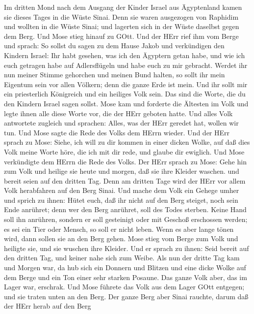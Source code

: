  Im dritten Mond nach dem Ausgang der Kinder Israel aus
Ägyptenland kamen sie dieses Tages in die Wüste Sinai.  Denn
sie waren ausgezogen von Raphidim und wollten in die Wüste Sinai; und
lagerten sich in der Wüste daselbst gegen dem Berg.  Und
Mose stieg hinauf zu GOtt. Und der HErr rief ihm vom Berge und sprach:
So sollst du sagen zu dem Hause Jakob und verkündigen den Kindern
Israel:  Ihr habt gesehen, was ich den Ägyptern getan habe,
und wie ich euch getragen habe auf Adlersflügeln und habe euch zu mir
gebracht.  Werdet ihr nun meiner Stimme gehorchen und meinen
Bund halten, so sollt ihr mein Eigentum sein vor allen Völkern; denn die
ganze Erde ist mein.  Und ihr sollt mir ein priesterlich
Königreich und ein heiliges Volk sein. Das sind die Worte, die du den
Kindern Israel sagen sollst.  Mose kam und forderte die
Ältesten im Volk und legte ihnen alle diese Worte vor, die der HErr
geboten hatte.  Und alles Volk antwortete zugleich und
sprachen: Alles, was der HErr geredet hat, wollen wir tun. Und Mose
sagte die Rede des Volks dem HErrn wieder.  Und der HErr
sprach zu Mose: Siehe, ich will zu dir kommen in einer dicken Wolke, auf
daß dies Volk meine Worte höre, die ich mit dir rede, und glaube dir
ewiglich. Und Mose verkündigte dem HErrn die Rede des Volks.
 Der HErr sprach zu Mose: Gehe hin zum Volk und heilige sie
heute und morgen, daß sie ihre Kleider waschen.  und bereit
seien auf den dritten Tag. Denn am dritten Tage wird der HErr vor allem
Volk herabfahren auf den Berg Sinai.  Und mache dem Volk
ein Gehege umher und sprich zu ihnen: Hütet euch, daß ihr nicht auf den
Berg steiget, noch sein Ende anrühret; denn wer den Berg anrühret, soll
des Todes sterben.  Keine Hand soll ihn anrühren, sondern
er soll gesteinigt oder mit Geschoß erschossen werden; es sei ein Tier
oder Mensch, so soll er nicht leben. Wenn es aber lange tönen wird, dann
sollen sie an den Berg gehen.  Mose stieg vom Berge zum
Volk und heiligte sie, und sie wuschen ihre Kleider.  Und
er sprach zu ihnen: Seid bereit auf den dritten Tag, und keiner nahe
sich zum Weibe.  Als nun der dritte Tag kam und Morgen war,
da hub sich ein Donnern und Blitzen und eine dicke Wolke auf dem Berge
und ein Ton einer sehr starken Posaune. Das ganze Volk aber, das im
Lager war, erschrak.  Und Mose führete das Volk aus dem
Lager GOtt entgegen; und sie traten unten an den Berg.  Der
ganze Berg aber Sinai rauchte, darum daß der HErr herab auf den Berg
